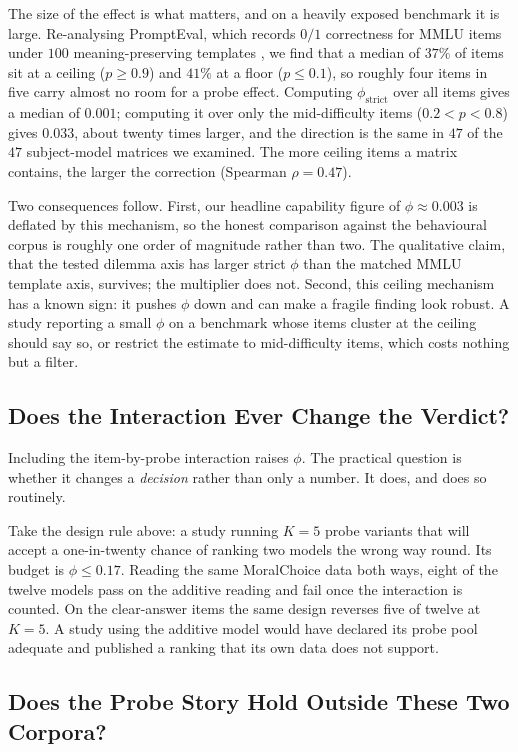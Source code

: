 \documentclass[11pt]{article}
\begin{document}
The size of the effect is what matters, and on a heavily exposed benchmark it is
large. Re-analysing PromptEval, which records $0/1$ correctness for MMLU items
under $100$ meaning-preserving templates \citep{polo2024efficient}, we find that
a median of $37\%$ of items sit at a ceiling ($p\ge0.9$) and $41\%$ at a floor
($p\le0.1$), so roughly four items in five carry almost no room for a probe
effect. Computing $\phi_{\text{strict}}$ over all items gives a median of
$0.001$; computing it over only the mid-difficulty items ($0.2<p<0.8$) gives
$0.033$, about twenty times larger, and the direction is the same in $47$ of the
$47$ subject-model matrices we examined. The more ceiling items a matrix
contains, the larger the correction (Spearman $\rho=0.47$).

Two consequences follow. First, our headline capability figure of $\phi\approx
0.003$ is deflated by this mechanism, so the honest comparison against the
behavioural corpus is roughly one order of magnitude rather than two. The
qualitative claim, that the tested dilemma axis has larger strict $\phi$ than
the matched MMLU template axis, survives; the multiplier does not. Second, this
ceiling mechanism has a known sign: it pushes $\phi$ down and can make a fragile
finding look robust. A study reporting a small $\phi$ on a
benchmark whose items cluster at the ceiling should say so, or restrict the
estimate to mid-difficulty items, which costs nothing but a filter.

\subsection{Does the Interaction Ever Change the Verdict?}
\label{app:verdictflip}

Including the item-by-probe interaction raises $\phi$. The practical question
is whether it changes a \emph{decision} rather than only a number. It does, and
does so routinely.

Take the design rule above: a study running $K=5$ probe
variants that will accept a one-in-twenty chance of ranking two models the wrong
way round. Its budget is $\phi\le0.17$. Reading the same MoralChoice data both
ways, eight of the twelve models pass on the additive reading and fail once the
interaction is counted. On the clear-answer items the same design reverses five
of twelve at $K=5$. A study using the additive model would have declared its probe pool
adequate and published a ranking that its own data does not support.

\subsection{Does the Probe Story Hold Outside These Two Corpora?}
\label{app:crossbench}
\end{document}
